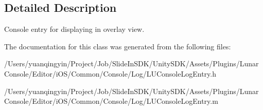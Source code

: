 \subsection{Detailed Description}
Console entry for displaying in overlay view. 

The documentation for this class was generated from the following files\+:\begin{DoxyCompactItemize}
\item 
/\+Users/yuanqingyin/\+Project/\+Job/\+Slide\+In\+S\+D\+K/\+Unity\+S\+D\+K/\+Assets/\+Plugins/\+Lunar\+Console/\+Editor/i\+O\+S/\+Common/\+Console/\+Log/L\+U\+Console\+Log\+Entry.\+h\item 
/\+Users/yuanqingyin/\+Project/\+Job/\+Slide\+In\+S\+D\+K/\+Unity\+S\+D\+K/\+Assets/\+Plugins/\+Lunar\+Console/\+Editor/i\+O\+S/\+Common/\+Console/\+Log/L\+U\+Console\+Log\+Entry.\+m\end{DoxyCompactItemize}
